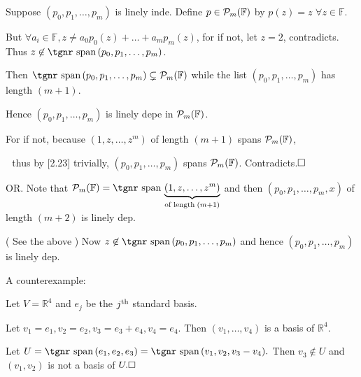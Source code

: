 \documentclass[a4paper, 11pt, UTF8]{article}
\newcommand{\Largebfx}[1]{{\Large\tgbfx#1}}
\def\Spn{{\textup{\tgnr span}}\,}
\def\Fbb{{\mathbb{F}}}
\def\Rbb{{\mathbb{R}}}
\def\Or{{\large O{\footnotesize R.} }}
\def\ChEnd{\rightline{\Largebfx{E{\small NDED}}}\par\vspace{6pt}}
\begin{document}
\begin{large}
\par\quad
Suppose $(p_0,p_1,\dots,p_m)$ is linely inde. Define $p\in\PoF{m}$ by $p(z)=z\,\,\forall z\in\Fbb.$\par\quad
But $\forall a_i\in\Fbb,z\neq a_0 p_0(z)+\dots+a_m p_m(z)$, for if not, let $z=2$, contradicts.
Thus $z\not\in\Spn(p_0,p_1,\dots,p_m)$.\par\quad
Then $\Spn(p_0,p_1,\dots,p_m)\subsetneq\PoF{m}$ while the list $(p_0,p_1,\dots,p_m)$ has length $(m+1)$.\par\quad
Hence $(p_0,p_1,\dots,p_m)$ is linely depe in $\PoF{m}$.\par\quad
For if not, because $(1,z,\dots,z^m)$ of length $(m+1)$ spans $\PoF{m}$,\par\qquad\qquad\quad\,\,
thus by [2.23] trivially, $(p_0,p_1,\dots,p_m)$ spans $\PoF{m}$. Contradicts.$\hfill\square$\vspace{10pt}\par\quad
\Or Note that $\PoF{m}=\Spn\underbrace{(1,z,\dots,z^m)}_{\TXT{of length\;}(m+1)}$ and then $(p_0,p_1,\dots,p_m,x)$ of length $(m+2)$ is linely dep.\vspace{3pt}\par\quad
( See the above ) Now $z\not\in\Spn(p_0,p_1,\dots,p_m)$ and hence $(p_0,p_1,\dots,p_m)$ is linely dep.\PfEnd
\SepLine\par
\ChEnd



A counterexample:\par\quad
Let $V=\Rbb^4$ and $e_j$ be the $j^{\textup{th}}$ standard basis.\par\quad
Let $v_1=e_1,v_2=e_2,v_3=e_3+e_4,v_4=e_4.$ Then $(v_1,\dots,v_4)$ is a basis of $\Rbb^4.$\par\quad
Let $U=\Spn(e_1,e_2,e_3)=\Spn(v_1,v_2,v_3-v_4).$ Then $v_3\not\in U$ and $(v_1,v_2)$ is not a basis of $U.\hfill\square$\par\SepLine\par


\end{large}
\end{document}
